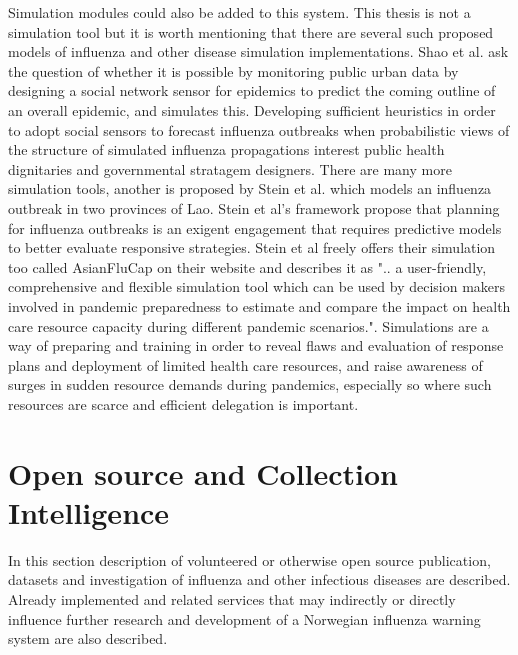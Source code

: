 Simulation modules could also be added to this system. This thesis is not a simulation tool but it is worth mentioning that there are several such proposed models of influenza and other disease simulation implementations. Shao et al. \cite{shao2016forecasting} ask the question of whether it is possible by monitoring public urban data by designing a social network sensor for epidemics to predict the coming outline of an overall epidemic, and simulates this. Developing sufficient heuristics in order to adopt social sensors to forecast influenza outbreaks when probabilistic views of the structure of simulated influenza propagations interest public health dignitaries and governmental stratagem designers. There are many more simulation tools, another is proposed by Stein et al. \cite{stein2012development} which models an influenza outbreak in two provinces of Lao. Stein et al's framework propose that planning for influenza outbreaks is an exigent engagement that requires predictive models to better evaluate responsive strategies. Stein et al freely offers their simulation too called AsianFluCap on their website and describes it as ".. a user-friendly, comprehensive and flexible simulation tool which can be used by decision makers involved in pandemic preparedness to estimate and compare the impact on health care resource capacity during different pandemic scenarios.". Simulations are a way of preparing and training in order to reveal flaws and evaluation of response plans and deployment of limited health care resources, and raise awareness of surges in sudden resource demands during pandemics, especially so where such resources are scarce and efficient delegation is important.


\section{Open source and Collection Intelligence}
In this section description of volunteered or otherwise open source publication, datasets and investigation of influenza and other infectious diseases are described. Already implemented and related services that may indirectly or directly influence further research and development of a Norwegian influenza warning system are also described.

